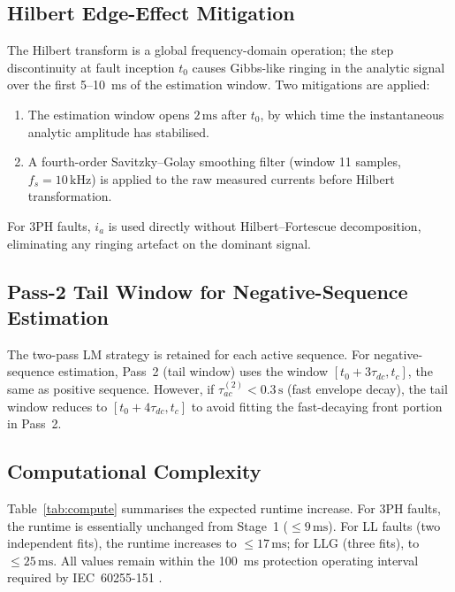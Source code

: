 \documentclass[10pt,journal,twoside]{IEEEtran}
\newcommand{\sss}{\,\text{s}}
\newcommand{\mss}{\,\text{ms}}
\begin{document}
\subsection{Hilbert Edge-Effect Mitigation}
\label{sec:practical:hilbert}

The Hilbert transform is a global frequency-domain operation; the step
discontinuity at fault inception $t_0$ causes Gibbs-like ringing in the
analytic signal over the first 5--10~ms of the estimation window.  Two
mitigations are applied:
\begin{enumerate}
\item The estimation window opens $2\mss$ after $t_0$, by which time the
      instantaneous analytic amplitude has stabilised.
\item A fourth-order Savitzky--Golay smoothing filter (window 11 samples,
      $f_s = 10\,\text{kHz}$) is applied to the raw measured currents
      before Hilbert transformation.
\end{enumerate}
For 3PH faults, $i_a$ is used directly without Hilbert--Fortescue
decomposition, eliminating any ringing artefact on the dominant signal.

\subsection{Pass-2 Tail Window for Negative-Sequence Estimation}
\label{sec:practical:pass2}

The two-pass LM strategy is retained for each active sequence.  For
negative-sequence estimation, Pass~2 (tail window) uses the window
$[t_0 + 3\tau_{dc}, t_c]$, the same as positive sequence.  However, if
$\tau_{ac}^{(2)} < 0.3\sss$ (fast envelope decay), the tail window reduces
to $[t_0 + 4\tau_{dc}, t_c]$ to avoid fitting the fast-decaying front
portion in Pass~2.

\subsection{Computational Complexity}
\label{sec:practical:compute}

Table~\ref{tab:compute} summarises the expected runtime increase.
For 3PH faults, the runtime is essentially unchanged from Stage~1
($\leq 9\mss$).  For LL faults (two independent fits), the
runtime increases to $\leq 17\mss$; for LLG (three fits),
to $\leq 25\mss$.  All values remain within the 100~ms
protection operating interval required by IEC~60255-151
\cite{IEC60255-151}.

\end{document}
